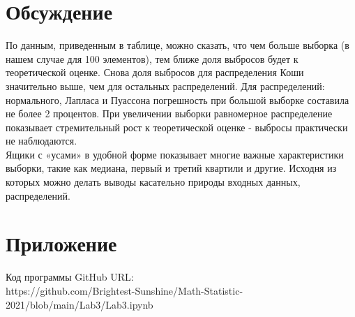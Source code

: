 \documentclass[a4paper]{article}
\begin{document}
\section{Обсуждение}
\noindent По данным, приведенным в таблице, можно сказать, что чем больше выборка (в нашем случае для 100 элементов), тем ближе доля выбросов будет к теоретической оценке. Снова доля выбросов для распределения Коши значительно выше, чем для остальных распределений. Для распределений: нормального, Лапласа и Пуассона погрешность при большой выборке составила не более 2 процентов. При увеличении выборки равномерное распределение показывает стремительный рост к теоретической оценке - выбросы практически не наблюдаются.\\

\noindent Ящики с «усами» в удобной форме показывает многие важные характеристики выборки, такие как медиана, первый и третий квартили и другие. Исходня из которых можно делать выводы касательно природы входных данных, распределений.

\section{Приложение}

\noindent Код программы GitHub URL:\\
\newline https://github.com/Brightest-Sunshine/Math-Statistic-2021/blob/main/Lab3/Lab3.ipynb
\end{document}
